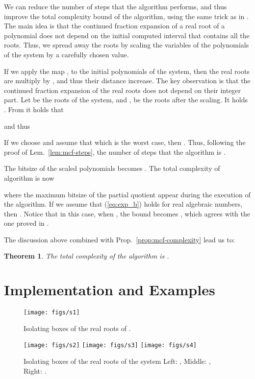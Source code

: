 \documentclass{sig-alternate}
\newtheorem{theorem}{Theorem}[section]
\begin{document}
We can reduce the number of steps that the algorithm performs, and thus improve
the total complexity bound of the algorithm, using the same trick as in
\cite{et-tcs-2007}.
The main idea is that the continued fraction expansion of a real root of a
polynomial does not depend on the initial computed interval that contains all
the roots.
Thus, we spread away the roots by scaling the variables of the polynomials of the
system by a carefully chosen value.

If we apply the map 
, to the initial
polynomials of the system, then the real roots are multiply by , and
thus their distance increase.
The key observation is that the continued fraction expansion of the real roots
does not depend on their integer part.
Let  be the roots of the system, and , be the roots after the
scaling. It holds .
From \cite{emt-dmm-2009} it holds that 

and thus

If we choose 
and assume that  which is the worst case, then 
.
Thus, following the proof of Lem.~\ref{lem:mcf-steps},
the number of steps that the algorithm is .

The bitsize of the scaled polynomials becomes
.
The total complexity of algorithm is now

where  the maximum bitsize of the partial quotient
appear during the execution of the algorithm.
If we assume that (\ref{eq:exp_b}) holds for real algebraic numbers, 
then . Notice that in
this case, when , the bound becomes , which agrees with
the one proved in \cite{et-tcs-2007}.

The discussion above combined with Prop.~\ref{prop:mcf-complexity} lead us to:

\begin{theorem}
  \label{th:improved-mcf-complexity}
  The total complexity of the algorithm is 
  .
\end{theorem}

\section{Implementation and Examples}\label{sec:impl}
\begin{figure}[t]
  \centering
  \texttt{[image: figs/s1]}
  \caption{Isolating boxes of the real roots of .}
  \label{fig:sys-1}
\end{figure}

\begin{figure*}[t]
  \centering
  \texttt{[image: figs/s2]}\hfill
  \texttt{[image: figs/s3]}\hfill
  \texttt{[image: figs/s4]}
  \caption{Isolating boxes of the real roots of the system 
    Left: , Middle: , Right: .}
  \label{fig:sys-2}
  \label{fig:sys-3}
  \label{fig:sys-4}
\end{figure*}
\end{document}
